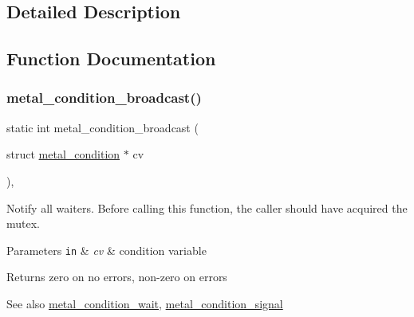 \subsection{Detailed Description}


\subsection{Function Documentation}
\mbox{\label{group__condition_ga80d63ed8a725e3a4a3291e58147fc4ae}} 
\subsubsection{\texorpdfstring{metal\+\_\+condition\+\_\+broadcast()}{metal\_condition\_broadcast()}}
{\footnotesize\ttfamily static int metal\+\_\+condition\+\_\+broadcast (\begin{DoxyParamCaption}\item[{struct \hyperlink{structmetal__condition}{metal\+\_\+condition} $\ast$}]{cv }\end{DoxyParamCaption})\hspace{0.3cm}{\ttfamily [inline]}, {\ttfamily [static]}}



Notify all waiters. Before calling this function, the caller should have acquired the mutex. 


\begin{DoxyParams}[1]{Parameters}
\mbox{\tt in}  & {\em cv} & condition variable \\
\hline
\end{DoxyParams}
\begin{DoxyReturn}{Returns}
zero on no errors, non-\/zero on errors 
\end{DoxyReturn}
\begin{DoxySeeAlso}{See also}
\hyperlink{group__condition_ga82b937a6692589f5a6025d823ac243c2}{metal\+\_\+condition\+\_\+wait}, \hyperlink{group__condition_ga042f4c19e3ddb3136365f4426e8bc439}{metal\+\_\+condition\+\_\+signal} 
\end{DoxySeeAlso}
\mbox{\label{group__condition_ga879378a795dc41afc4025c083f203e4e}} 
